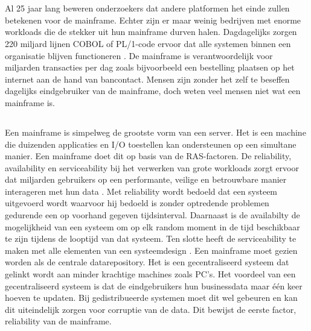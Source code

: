 
\chapter{}
\label{ch:inleiding}
Al 25 jaar lang beweren onderzoekers dat andere platformen het einde zullen betekenen voor de mainframe. Echter zijn er maar weinig bedrijven met enorme workloads die de stekker uit hun mainframe durven halen. Dagdagelijks zorgen 220 miljard lijnen COBOL of PL/1-code ervoor dat alle systemen binnen een organisatie blijven functioneren \autocite{Scannell2017}. De mainframe is verantwoordelijk voor miljarden transacties per dag zoals bijvoorbeeld een bestelling plaatsen op het internet aan de hand van bancontact. Mensen zijn zonder het zelf te beseffen dagelijks eindgebruiker van de mainframe, doch weten veel mensen niet wat een mainframe is. 

\section{}

Een mainframe is simpelweg de grootste vorm van een server. Het is een machine die duizenden applicaties en I/O toestellen kan ondersteunen op een simultane manier.  Een mainframe doet dit op basis van de RAS-factoren. De reliability, availability en serviceability bij het verwerken van grote workloads zorgt ervoor dat miljarden gebruikers op een performante, veilige en betrouwbare manier interageren met hun data \autocite{Ebbers2022}. Met reliability wordt bedoeld dat een systeem uitgevoerd wordt waarvoor hij bedoeld is zonder optredende problemen gedurende een op voorhand gegeven tijdsinterval. Daarnaast is de availabilty de mogelijkheid van een systeem om op elk random moment in de tijd beschikbaar te zijn tijdens de looptijd van dat systeem. Ten slotte heeft de serviceability te maken met alle elementen van een systeemdesign \autocite{Johnson1988}.  Een mainframe moet gezien worden als de centrale datarepository. Het is een gecentraliseerd systeem dat gelinkt wordt aan minder krachtige machines zoals PC's.  Het voordeel van een gecentraliseerd systeem is dat de eindgebruikers hun businessdata maar één keer hoeven te updaten. Bij gedistribueerde systemen moet dit wel gebeuren en kan dit uiteindelijk zorgen voor corruptie van de data. Dit bewijst de eerste factor, reliability van de mainframe. 

